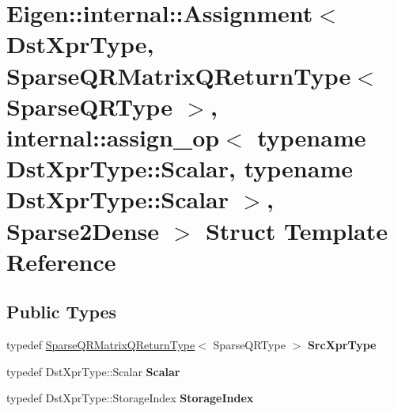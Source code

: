\hypertarget{struct_eigen_1_1internal_1_1_assignment_3_01_dst_xpr_type_00_01_sparse_q_r_matrix_q_return_type_aa91d8fc26832a494363cd7146c14303}{}\section{Eigen\+::internal\+::Assignment$<$ Dst\+Xpr\+Type, Sparse\+Q\+R\+Matrix\+Q\+Return\+Type$<$ Sparse\+Q\+R\+Type $>$, internal\+::assign\+\_\+op$<$ typename Dst\+Xpr\+Type\+::Scalar, typename Dst\+Xpr\+Type\+::Scalar $>$, Sparse2\+Dense $>$ Struct Template Reference}
\label{struct_eigen_1_1internal_1_1_assignment_3_01_dst_xpr_type_00_01_sparse_q_r_matrix_q_return_type_aa91d8fc26832a494363cd7146c14303}
\subsection*{Public Types}
\begin{DoxyCompactItemize}
\item 
\mbox{\label{struct_eigen_1_1internal_1_1_assignment_3_01_dst_xpr_type_00_01_sparse_q_r_matrix_q_return_type_aa91d8fc26832a494363cd7146c14303_a70e8931a8c4b0ba14aa81dfad16bfb40}} 
typedef \mbox{\hyperlink{struct_eigen_1_1_sparse_q_r_matrix_q_return_type}{Sparse\+Q\+R\+Matrix\+Q\+Return\+Type}}$<$ Sparse\+Q\+R\+Type $>$ {\bfseries Src\+Xpr\+Type}
\item 
\mbox{\label{struct_eigen_1_1internal_1_1_assignment_3_01_dst_xpr_type_00_01_sparse_q_r_matrix_q_return_type_aa91d8fc26832a494363cd7146c14303_a984972577f134d4f22af56f47b30e70f}} 
typedef Dst\+Xpr\+Type\+::\+Scalar {\bfseries Scalar}
\item 
\mbox{\label{struct_eigen_1_1internal_1_1_assignment_3_01_dst_xpr_type_00_01_sparse_q_r_matrix_q_return_type_aa91d8fc26832a494363cd7146c14303_ab019ba7d743296423b446e15d0131ad2}} 
typedef Dst\+Xpr\+Type\+::\+Storage\+Index {\bfseries Storage\+Index}
\end{DoxyCompactItemize}
